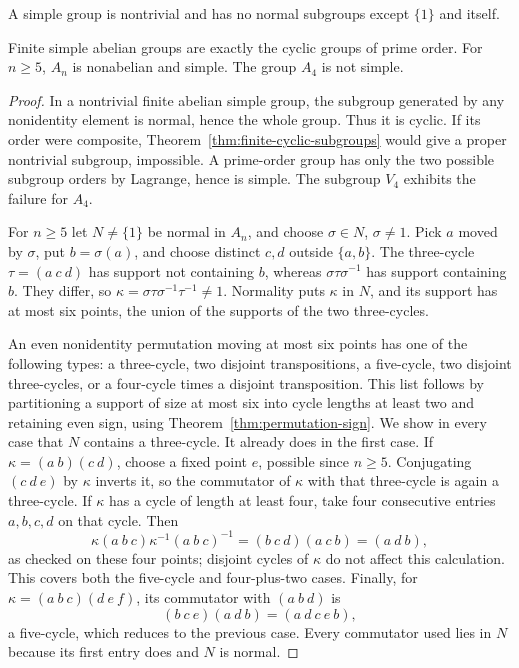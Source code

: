 \begin{definition}
A simple group is nontrivial and has no normal subgroups except $\{1\}$ and itself.
\end{definition}
\begin{theorem}\label{thm:alternating-simple}
Finite simple abelian groups are exactly the cyclic groups of prime order. For $n\geq5$, $A_n$ is nonabelian and simple. The group $A_4$ is not simple.
\end{theorem}
\begin{proof}
In a nontrivial finite abelian simple group, the subgroup generated by any nonidentity element is normal, hence the whole group. Thus it is cyclic. If its order were composite, Theorem~\ref{thm:finite-cyclic-subgroups} would give a proper nontrivial subgroup, impossible. A prime-order group has only the two possible subgroup orders by Lagrange, hence is simple. The subgroup $V_4$ exhibits the failure for $A_4$.

For $n\geq5$ let $N\ne\{1\}$ be normal in $A_n$, and choose $\sigma\in N$, $\sigma\ne1$. Pick $a$ moved by $\sigma$, put $b=\sigma(a)$, and choose distinct $c,d$ outside $\{a,b\}$. The three-cycle $\tau=(a\ c\ d)$ has support not containing $b$, whereas $\sigma\tau\sigma^{-1}$ has support containing $b$. They differ, so
$\kappa=\sigma\tau\sigma^{-1}\tau^{-1}\ne1$. Normality puts $\kappa$ in $N$, and its support has at most six points, the union of the supports of the two three-cycles.

An even nonidentity permutation moving at most six points has one of the following types: a three-cycle, two disjoint transpositions, a five-cycle, two disjoint three-cycles, or a four-cycle times a disjoint transposition. This list follows by partitioning a support of size at most six into cycle lengths at least two and retaining even sign, using Theorem~\ref{thm:permutation-sign}. We show in every case that $N$ contains a three-cycle. It already does in the first case. If $\kappa=(a\ b)(c\ d)$, choose a fixed point $e$, possible since $n\geq5$. Conjugating $(c\ d\ e)$ by $\kappa$ inverts it, so the commutator of $\kappa$ with that three-cycle is again a three-cycle. If $\kappa$ has a cycle of length at least four, take four consecutive entries $a,b,c,d$ on that cycle. Then
\[
 \kappa(a\ b\ c)\kappa^{-1}(a\ b\ c)^{-1}
 =(b\ c\ d)(a\ c\ b)=(a\ d\ b),
\]
as checked on these four points; disjoint cycles of $\kappa$ do not affect this calculation. This covers both the five-cycle and four-plus-two cases. Finally, for $\kappa=(a\ b\ c)(d\ e\ f)$, its commutator with $(a\ b\ d)$ is
\[
 (b\ c\ e)(a\ d\ b)=(a\ d\ c\ e\ b),
\]
a five-cycle, which reduces to the previous case. Every commutator used lies in $N$ because its first entry does and $N$ is normal.


\end{proof}
